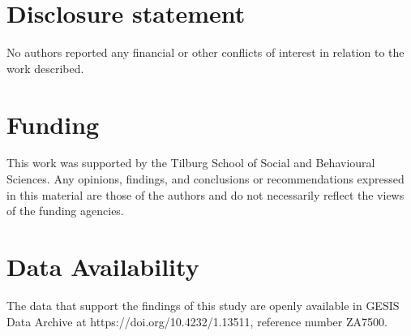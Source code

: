 \documentclass[]{./cls/interact}
\theoremstyle{plain}
\theoremstyle{definition}
\theoremstyle{remark}
\newcommand{\pathBIB}{./bib}
\begin{document}




\section*{Disclosure statement}
No authors reported any financial or other conflicts 
of interest in relation to the work described.
%
\section*{Funding} 
This work was supported by the Tilburg School of Social and Behavioural Sciences.
Any opinions, findings, and conclusions or recommendations expressed in this material are those of the authors
and do not necessarily reflect the views of the funding agencies.
%
\section*{Data Availability}
The data that support the findings of this study are openly available 
in GESIS Data Archive at https://doi.org/10.4232/1.13511, reference number ZA7500.

 


\end{document}

